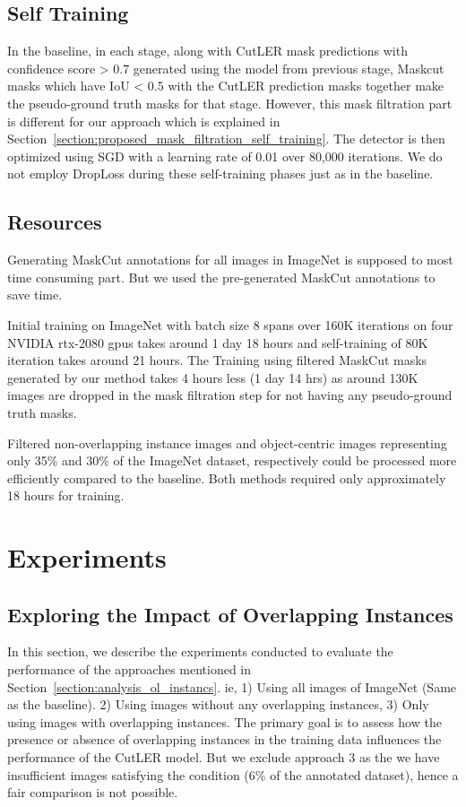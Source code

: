 \subsection{Self Training}
In the baseline, in each stage, along with CutLER mask predictions with confidence score > 0.7 generated using the model from previous stage, Maskcut masks which have IoU < 0.5 with the CutLER prediction masks together make the pseudo-ground truth masks for that stage. However, this mask filtration part is different for our approach which is explained in Section~\ref{section:proposed_mask_filtration_self_training}. The detector is then optimized using SGD with a learning rate of 0.01 over 80,000 iterations. We do not employ DropLoss during these self-training phases just as in the baseline.

\subsection{Resources}
Generating MaskCut annotations for all images in ImageNet is supposed to most time consuming part. But we used the pre-generated MaskCut annotations to save time.

Initial training on ImageNet with batch size 8 spans over 160K iterations on four NVIDIA rtx-2080 gpus takes around 1 day 18 hours and self-training of 80K iteration takes around 21 hours. The Training using filtered MaskCut masks generated by our method takes 4 hours less (1 day 14 hrs) as around 130K images are dropped in the mask filtration step for not having any pseudo-ground truth masks.


Filtered non-overlapping instance images and object-centric images representing only 35\% and 30\% of the ImageNet dataset, respectively could be processed more efficiently compared to the baseline. Both methods required only approximately 18 hours for training.

\section{Experiments}
\subsection{Exploring the Impact of Overlapping Instances}
\label{section:overlap_experiment}
In this section, we describe the experiments conducted to evaluate the performance of the approaches mentioned in Section~\ref{section:analysis_ol_instancs}. ie, 1) Using all images of ImageNet (Same as the baseline). 2) Using images without any overlapping instances, 3)  Only using images with overlapping instances. The primary goal is to assess how the presence or absence of overlapping instances in the training data influences the performance of the CutLER model. But we exclude approach 3 as the we have insufficient images satisfying the condition (6\% of the annotated dataset), hence a fair comparison is not possible.


